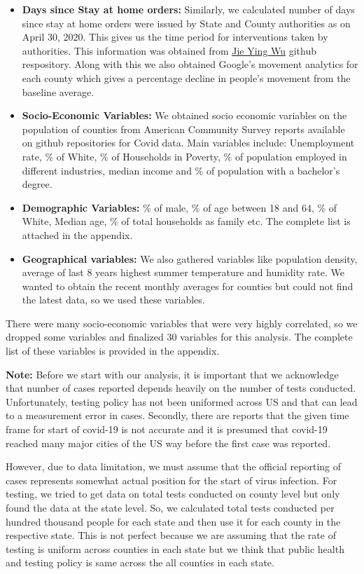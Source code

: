 \documentclass[
]{article}
\begin{document}
\begin{itemize}
\item
  \textbf{Days since Stay at home orders:} Similarly, we calculated
  number of days since stay at home orders were issued by State and
  County authorities as on April 30, 2020. This gives us the time period
  for interventions taken by authorities. This information was obtained
  from
  \href{https://github.com/JieYingWu/COVID-19_US_County-level_Summaries}{Jie
  Ying Wu} github respository. Along with this we also obtained Google's
  movement analytics for each county which gives a percentage decline in
  people's movement from the baseline average.
\item
  \textbf{Socio-Economic Variables:} We obtained socio economic
  variables on the population of counties from American Community Survey
  reports available on github repositories for Covid data. Main
  variables include: Unemployment rate, \% of White, \% of Households in
  Poverty, \% of population employed in different industries, median
  income and \% of population with a bachelor's degree.
\item
  \textbf{Demographic Variables:} \% of male, \% of age between 18 and
  64, \% of White, Median age, \% of total households as family etc. The
  complete list is attached in the appendix.
\item
  \textbf{Geographical variables:} We also gathered variables like
  population density, average of last 8 years highest summer temperature
  and humidity rate. We wanted to obtain the recent monthly averages for
  counties but could not find the latest data, so we used these
  variables.
\end{itemize}

There were many socio-economic variables that were very highly
correlated, so we dropped some variables and finalized 30 variables for
this analysis. The complete list of these variables is provided in the
appendix.

\textbf{Note:} Before we start with our analysis, it is important that
we acknowledge that number of cases reported depends heavily on the
number of tests conducted. Unfortunately, testing policy has not been
uniformed across US and that can lead to a measurement error in cases.
Secondly, there are reports that the given time frame for start of
covid-19 is not accurate and it is presumed that covid-19 reached many
major cities of the US way before the first case was reported.

However, due to data limitation, we must assume that the official
reporting of cases represents somewhat actual position for the start of
virus infection. For testing, we tried to get data on total tests
conducted on county level but only found the data at the state level.
So, we calculated total tests conducted per hundred thousand people for
each state and then use it for each county in the respective state. This
is not perfect because we are assuming that the rate of testing is
uniform across counties in each state but we think that public health
and testing policy is same across the all counties in each state.
\end{document}
